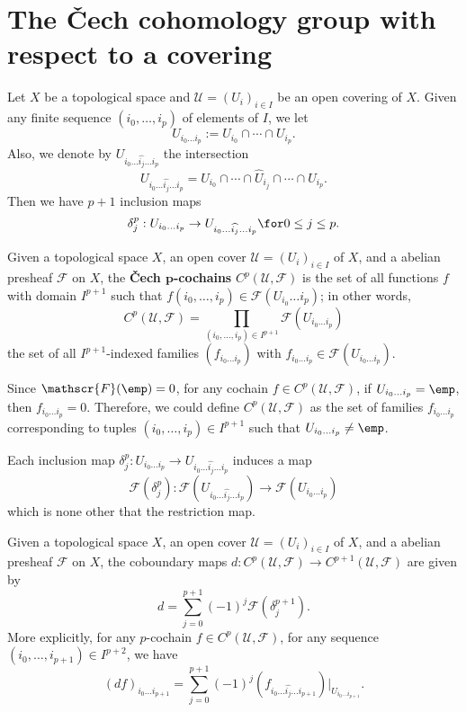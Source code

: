 \section{The \v{C}ech cohomology group with respect to a covering}
Let $X$ be a topological space and $\mathcal{U}=(U_i)_{i\in I}$ be an open covering of $X$. Given any finite sequence $(i_0,\dots,i_p)$ of elements of $I$, we let
\[U_{i_0\dots i_p}:=U_{i_0}\cap\cdots\cap U_{i_p}.\]
Also, we denote by $U_{i_0\dots\widehat{i_j}\dots i_p}$ the intersection
\[U_{i_0\dots\widehat{i_j}\dots i_p}=U_{i_0}\cap\cdots\cap\widehat{U}_{i_j}\cap\cdots\cap U_{i_p}.\]
Then we have $p+1$ inclusion maps
\[\delta^p_j:U_{i_0\dots i_p}\to U_{i_0\dots\widehat{i_j}\dots i_p}\for 0\leq j\leq p.\]
\begin{definition}
Given a topological space $X$, an open cover $\mathcal{U}=(U_i)_{i\in I}$ of $X$, and a abelian presheaf $\mathscr{F}$ on $X$, the \textbf{\v{C}ech $\bm{p}$-cochains} $C^p(\mathcal{U},\mathscr{F})$ is the set of all functions $f$ with domain $I^{p+1}$ such that $f(i_0,\dots,i_{p})\in\mathscr{F}(U_{i_0}\dots i_p)$; in other words,
\[C^p(\mathcal{U},\mathscr{F})=\prod_{(i_0,\dots,i_p)\in I^{p+1}}\mathscr{F}(U_{i_0\dots i_p})\]
the set of all $I^{p+1}$-indexed families $(f_{i_0\dots i_p})$ with $f_{i_0\dots i_p}\in\mathscr{F}(U_{i_0\dots i_p})$.
\end{definition}
\begin{remark}
Since $\mathscr{F}(\emp)=0$, for any cochain $f\in C^p(\mathcal{U},\mathscr{F})$, if $U_{i_0\dots i_p}=\emp$, then $f_{i_0\dots i_p}=0$. Therefore, we could define $C^p(\mathcal{U},\mathscr{F})$ as the set of families $f_{i_0\dots i_p}$ corresponding to tuples $(i_0,\dots,i_p)\in I^{p+1}$ such that $U_{i_0\dots i_p}\neq\emp$.
\end{remark}
Each inclusion map $\delta^p_j:U_{i_0\dots i_p}\to U_{i_0\dots\widehat{i_j}\dots i_p}$ induces a map
\[\mathscr{F}(\delta^p_j):\mathscr{F}(U_{i_0\dots\widehat{i_j}\dots i_p})\to\mathscr{F}(U_{i_0\dots i_p})\]
which is none other that the restriction map.
\begin{definition}
Given a topological space $X$, an open cover $\mathcal{U}=(U_i)_{i\in I}$ of $X$, and a abelian presheaf $\mathscr{F}$ on $X$, the coboundary maps $d:C^p(\mathcal{U},\mathscr{F})\to C^{p+1}(\mathcal{U},\mathscr{F})$ are given by
\[d=\sum_{j=0}^{p+1}(-1)^j\mathscr{F}(\delta^{p+1}_j).\]
More explicitly, for any $p$-cochain $f\in C^p(\mathcal{U},\mathscr{F})$, for any sequence $(i_0,\dots,i_{p+1})\in I^{p+2}$, we have
\[(df)_{i_0\dots i_{p+1}}=\sum_{j=0}^{p+1}(-1)^j(f_{i_0\dots\widehat{i_j}\dots i_{p+1}})|_{U_{i_0\dots i_{p+1}}}.\]
\end{definition}
